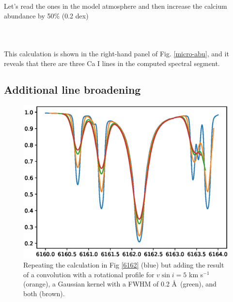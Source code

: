 \documentclass[]{article}
\begin{document}
Let's read the ones in the model atmosphere and then increase the calcium abundance by 50\% (0.2 dex) 
\\
\\
\\
\\
This calculation is shown in the right-hand panel of Fig. \ref{micro-abu}, and it reveals that there are three Ca I lines in the computed spectral segment. 


\subsection{Additional line broadening}
\label{fwhm}

\begin{figure}[t!]
\centering
\includegraphics[width=14cm]{Figure_3.ps}
\caption{Repeating the calculation in Fig \ref{6162} (blue) but adding the result of a convolution with a rotational profile for $v \sin i = 5$ km s$^{-1}$ (orange), a Gaussian kernel with a FWHM of 0.2 \AA\ (green), and both (brown).
\label{convolution}
}
\end{figure}
\end{document}
